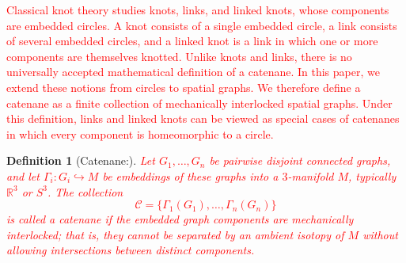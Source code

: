 \documentclass[times,twocolumn,final]{elsarticle}
\newtheorem{definition}[theorem]{Definition}
\begin{document}





\textcolor{red}{Classical knot theory studies knots, links, and linked knots, whose components are embedded circles. A knot consists of a single embedded circle, a link consists of several embedded circles, and a linked knot is a link in which one or more components are themselves knotted. Unlike knots and links, there is no universally accepted mathematical definition of a catenane. In this paper, we extend these notions from circles to spatial graphs. We therefore define a catenane as a finite collection of mechanically interlocked spatial graphs. Under this definition, links and linked knots can be viewed as special cases of catenanes in which every component is homeomorphic to a circle.}

\begin{definition}[Catenane:]
\textcolor{red}{Let $G_1,\ldots,G_n$ be pairwise disjoint connected graphs, and let $\Gamma_i: G_i \hookrightarrow M$ be embeddings of these graphs into a $3$-manifold $M$, typically $\mathbb{R}^3$ or $S^3$. The collection
\[
\mathcal{C}=\{\Gamma_1(G_1),\ldots,\Gamma_n(G_n)\}
\]
is called a \emph{catenane} if the embedded graph components are mechanically interlocked; that is, they cannot be separated by an ambient isotopy of $M$ without allowing intersections between distinct components.}
\end{definition}
\end{document}
